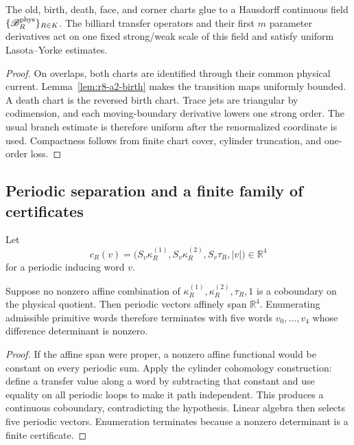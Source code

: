 \begin{theorem}
\label{thm:r8-a2-field}
The old, birth, death, face, and corner charts glue to a Hausdorff continuous
field $\{\mathscr B_R^{\rm phys}\}_{R\in K}$.  The billiard transfer operators
and their first $m$ parameter derivatives act on one fixed strong/weak scale
of this field and satisfy uniform Lasota--Yorke estimates.
\end{theorem}

\begin{proof}
On overlaps, both charts are identified through their common physical current.
Lemma~\ref{lem:r8-a2-birth} makes the transition maps uniformly bounded.  A
death chart is the reversed birth chart.  Trace jets are triangular by
codimension, and each moving-boundary derivative lowers one strong order.  The
usual branch estimate is therefore uniform after the renormalized coordinate
is used.  Compactness follows from finite chart cover, cylinder truncation,
and one-order loss.
\end{proof}

\subsection{Periodic separation and a finite family of certificates}

Let
\[
 c_R(v)=\bigl(S_v\kappa_R^{(1)},S_v\kappa_R^{(2)},S_v\tau_R,|v|\bigr)
 \in\mathbb R^4
\]
for a periodic inducing word $v$.

\begin{lemma}
\label{lem:r8-a2-span}
Suppose no nonzero affine combination of
$\kappa_R^{(1)},\kappa_R^{(2)},\tau_R,1$ is a coboundary on the physical
quotient.  Then periodic vectors affinely span $\mathbb R^4$.  Enumerating
admissible primitive words therefore terminates with five words
$v_0,\ldots,v_4$ whose difference determinant is nonzero.
\end{lemma}

\begin{proof}
If the affine span were proper, a nonzero affine functional would be constant
on every periodic sum.  Apply the cylinder cohomology construction: define a
transfer value along a word by subtracting that constant and use equality on
all periodic loops to make it path independent.  This produces a continuous
coboundary, contradicting the hypothesis.  Linear algebra then selects five
periodic vectors.  Enumeration terminates because a nonzero determinant is a
finite certificate.
\end{proof}


